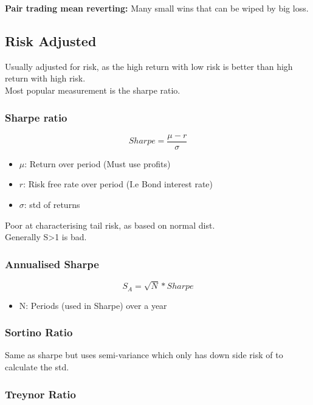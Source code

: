 \documentclass[11pt]{scrartcl} %
\begin{document}
\textbf{Pair trading mean reverting:} Many small wins that can be wiped by big loss.

\subsection{Risk Adjusted}

Usually adjusted for risk, as the high return with low risk is better than high return with high risk.\\

Most popular measurement is the sharpe ratio.

\subsubsection{Sharpe ratio}

\[ Sharpe=\frac{\mu - r}{\sigma } \]

\begin{itemize}
	\item $\mu$: Return over period (Must use profits)
	\item $r$: Risk free rate over period (I.e Bond interest rate)
	\item $\sigma $: std of returns 
\end{itemize}

Poor at characterising tail risk, as based on normal dist.\\

Generally S>1 is bad.

\subsubsection{Annualised Sharpe}

\[ S_A = \sqrt{N} * Sharpe \]

\begin{itemize}
	\item N: Periods (used in Sharpe) over a year 
\end{itemize}

\subsubsection{Sortino Ratio}

Same as sharpe but uses semi-variance which only has down side risk of to calculate the std.

\subsubsection{Treynor Ratio}
\end{document}
